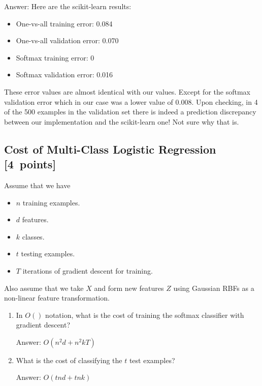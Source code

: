 \documentclass{article}
\newcommand{\blu}[1]{{\textcolor{blu}{#1}}}
\newenvironment{answer}{\par\begingroup\color{gre}Answer: }{\endgroup}
\let\ask\blu
\newcommand\pts[1]{\textcolor{pointscolour}{[#1~points]}}
\begin{document}
\begin{answer}
    Here are the scikit-learn results:
    \begin{itemize}
        \item One-vs-all training error: 0.084
        \item One-vs-all validation error: 0.070
        \item Softmax training error: 0
        \item Softmax validation error: 0.016
    \end{itemize}

    These error values are almost identical with our values. Except for the softmax validation error which in our case was a lower value of $0.008$. Upon checking, in 4 of the 500 examples in the validation set there is indeed a prediction discrepancy between our implementation and the scikit-learn one! Not sure why that is.
\end{answer}

\subsection{Cost of Multi-Class Logistic Regression \pts{4}}

Assume that we have
\begin{itemize}
    \item $n$ training examples.
    \item $d$ features.
    \item $k$ classes.
    \item $t$ testing examples.
    \item $T$ iterations of gradient descent for training.
\end{itemize}
Also assume that we take $X$ and form new features $Z$ using Gaussian RBFs as a non-linear feature transformation.
\begin{enumerate}
\item \ask{In $O()$ notation, what is the cost of training the softmax classifier with gradient descent?}
\begin{answer}
    $O(n^2d + n^2kT)$
\end{answer}

\item \ask{What is the cost of classifying the $t$ test examples?}
\begin{answer}
    $O(tnd + tnk)$
\end{answer}
\end{enumerate}
\end{document}
